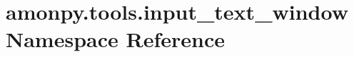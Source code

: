 \hypertarget{namespaceamonpy_1_1tools_1_1input__text__window}{\section{amonpy.\-tools.\-input\-\_\-text\-\_\-window Namespace Reference}
\label{namespaceamonpy_1_1tools_1_1input__text__window}
}
